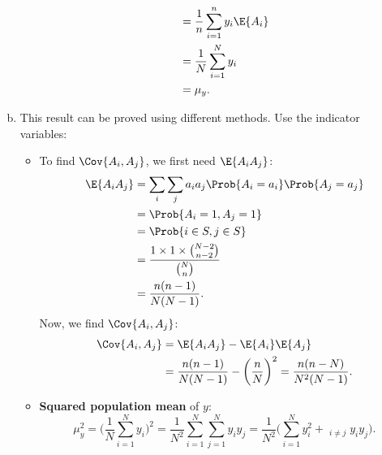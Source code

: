 \begin{Result}{}
\begin{enumerate}[(a)]
\begin{itemize}
\begin{align*}
                                         & =\frac{1}{n}\sum_{i=1}^{n}y_i\E{A_i}                                        \\
                                         & =\frac{1}{N}\sum_{i=1}^{N}y_i                                               \\
                                         & =\mu_y.
                        \end{align*}
              \end{itemize}
        \item This result can be proved using different methods. Use the indicator variables:
              \begin{itemize}
                  \item To find $ \Cov{A_i,A_j} $, we first need $ \E{A_i A_j} $:
                        \begin{align*}
                            \E{A_i A_j} & =\sum_i\sum_j a_i a_j \Prob{A_i=a_i}\Prob{A_j=a_j}     \\
                                        & =\Prob{A_i=1,A_j=1}                                    \\
                                        & =\Prob{i\in S,j\in S}                                  \\
                                        & =\frac{1\times 1\times \binom{N-2}{n-2}}{\binom{N}{n}} \\
                                        & =\frac{n(n-1)}{N(N-1)}.
                        \end{align*}
                        Now, we find $ \Cov{A_i,A_j} $:
                        \begin{align*}
                            \Cov{A_i,A_j} & =\E{A_i A_j}-\E{A_i}\E{A_j}                                                 \\
                                          & =\frac{n(n-1)}{N(N-1)}-\biggl(\frac{n}{N}\biggr)^2=\frac{n(n-N)}{N^2(N-1)}.
                        \end{align*}
                  \item \textbf{Squared population mean} of $ y $:
                        \[ \mu_y^2
                            =\biggl(\frac{1}{N}\sum_{i=1}^{N}y_i\biggr)^2
                            =\frac{1}{N^2}\sum_{i=1}^{N}\sum_{j=1}^{N}y_i y_j
                            =\frac{1}{N^2}\biggl(\sum_{i=1}^{N}y_i^2+\mathop{\sum_{i=1}^{N}\sum_{j=1}^{N}}_{i\ne j}y_i y_j\biggr).
                        \]
              \end{itemize}

\end{enumerate}
\end{Result}
